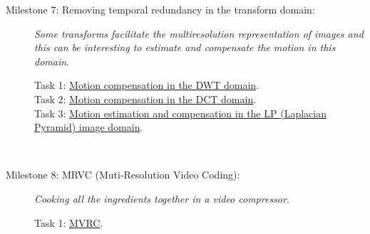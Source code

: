 \begin{description}
\item [Milestone 7: {\normalfont Removing temporal redundancy in the
    transform domain:}] \emph{Some transforms facilitate the
multiresolution representation of images and this can be interesting to
estimate and compensate the motion in this domain}.
  \begin{description}
  \item [Task 1: {\normalfont
      \href{https://sistemas-multimedia.github.io/contents/ME_MC_in_DWT_domain/}{Motion
        compensation in the DWT domain}.}]
  \item [Task 2: {\normalfont
      \href{https://sistemas-multimedia.github.io/contents/ME_MC_in_DCT_domain/}{Motion
        compensation in the DCT domain}.}]
  \item [Task 3: {\normalfont
      \href{https://sistemas-multimedia.github.io/contents/ME_MC_in_LP_domain/}{Motion
        estimation and compensation in the LP (Laplacian Pyramid) image domain}.}]
  \end{description}
  ~\newline

\item [Milestone 8: {\normalfont MRVC (Muti-Resolution Video
    Coding):}] \emph{Cooking all the ingredients together in a video compressor}.
  \begin{description}
  \item [Task 1: {\normalfont
      \href{https://github.com/Sistemas-Multimedia/MRVC}{MVRC}.}]
  \end{description}

  
  \begin{comment}

 \item [Milestone 2: {\normalfont Removing the color redundancy:}]
   \emph{In color images, the RGB channels tend to be highly
   correlated. We can take advantage of this channel correlation, for
   example, to decrease the entropy and therefore, increase the
   compression ratio in image and video coding}.
  \begin{description}
  \item [Task 4: {\normalfont
      \href{https://sistemas-multimedia.github.io/contents/color_DCT/}{The
        1D-DCT (1-Dimensional Discrete Cosine Transform) transform}
      applied over the color domain.}]
  \item [Task 5: {\normalfont
      \href{https://sistemas-multimedia.github.io/contents/YCrCb/}{The
        YCrCb transform}.}]
  \item [Task 6: {\normalfont
      \href{https://sistemas-multimedia.github.io/contents/YCoCg/}{The
        YCoCg transform}.}]
  \end{description}
  ~\newline


\end{comment}
\end{description}
